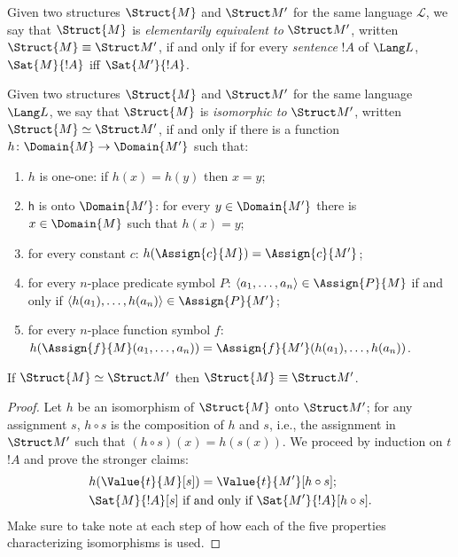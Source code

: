 \documentclass[../../include/open-logic-section]{subfiles}
\begin{document}

\begin{defn}
  Given two structures $\Struct{M}$ and $\Struct M'$ for the same
  language $\mathcal{L}$, we say that $\Struct{M}$ is
  \emph{elementarily equivalent to} $\Struct M'$, written $\Struct{M}
  \equiv \Struct M'$, if and only if for every \emph{sentence} $!A$ of
  $\Lang L$, $\Sat{M}{!A}$ iff $\Sat{M'}{!A}$.
\end{defn}

\begin{defn}
  Given two structures $\Struct{M}$ and $\Struct M'$ for the same
  language $\Lang L$, we say that    $\Struct{M}$ is
  \emph{isomorphic to} $\Struct M'$, written
  $\Struct{M} \simeq \Struct M'$, if and only if there is a
  function $h\colon \Domain{M} \to \Domain{M'}$ such that:
  \begin{enumerate}
  \item $h$ is one-one: if $h(x) =
    h(y)$ then $x = y$; 
  \item $\mathsf{h}$ is onto $\Domain{M'}$: for every $y \in
    \Domain{M'}$ there is $x \in \Domain{M}$ such that $h(x) = y$;
  \item for every constant $c$: $h(\Assign{c}{M}) =
    \Assign{c}{M'}$; 
  \item for every $n$-place predicate symbol $P$: $\langle
    a_1,\dots,a_n\rangle \in \Assign{P}{M}$ if and only if  $\langle
    h(a_1),\dots,h(a_n)\rangle \in \Assign{P}{M'}$;
  \item for every $n$-place function symbol $f$:
    $h(\Assign{f}{M}(a_1,\dots,a_n)) =
    \Assign{f}{M'}(h(a_1),\ldots,h(a_n))$.
 \end{enumerate}
\end{defn}

\begin{thm}
  If $\Struct{M} \simeq \Struct M'$ then $\Struct{M} \equiv
  \Struct M'$.
\end{thm}

\begin{proof}
  Let $h$ be an isomorphism of $\Struct{M}$ onto
  $\Struct M'$; for any assignment $s$, $h \circ s$ is the
  composition of $h$ and $s$, i.e., the assignment in
  $\Struct M'$ such that  $(h \circ s)(x) = h(s(x))$.
  We proceed by induction on $t$ $!A$ and prove the stronger claims: 
  \begin{align*}
  &  h(\Value{t}{M}[s]) = \Value{t}{M'}[h\circ s];\\
  &  \Sat{M}{!A}[s] \text{ if and only if }
    \Sat{M'}{!A}[h \circ s].
  \end{align*}
Make sure to take note at each step of how each of the five properties
characterizing isomorphisms is used.    
\end{proof}
\end{document}
